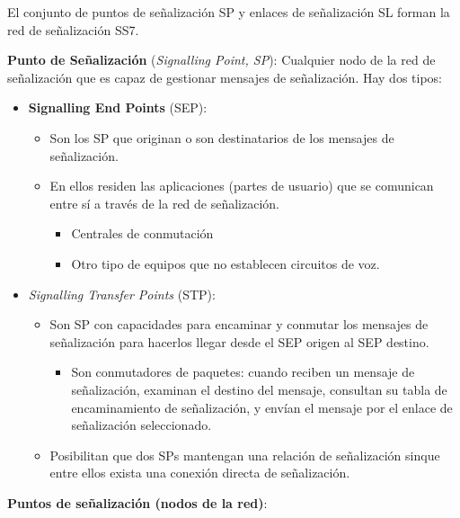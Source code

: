 \documentclass[10pt,portrait, twocolumn]{article}
\begin{document}
El conjunto de puntos de señalización SP y enlaces de señalización SL forman la red de señalización SS7.

\textbf{Punto de Señalización} (\textit{Signalling Point, SP}): Cualquier nodo de la red de señalización que es capaz de gestionar mensajes de señalización. Hay dos tipos:

	\begin{itemize}
	\item \textbf{Signalling End Points } (SEP):
		\begin{itemize}
		\item Son los SP que originan o son destinatarios de los mensajes de señalización.
		\item En ellos residen las aplicaciones (partes de usuario) que se comunican entre sí a través de la red de señalización.
			\begin{itemize}
			\item Centrales de conmutación 
			\item Otro tipo de equipos que no establecen circuitos de voz.
			\end{itemize}
	
		\end{itemize}
	\item \textit{Signalling Transfer Points} (STP):
		\begin{itemize}
		\item Son SP con capacidades para encaminar y conmutar los mensajes de señalización para hacerlos llegar desde el SEP origen al SEP destino.
			\begin{itemize}
			\item Son conmutadores de paquetes: cuando reciben un mensaje de señalización, examinan el destino del mensaje, consultan su tabla de encaminamiento de señalización, y envían el mensaje por el enlace de señalización seleccionado.
			\end{itemize}
			\item Posibilitan que dos SPs mantengan una relación de señalización sinque entre ellos exista una conexión directa de señalización.
		\end{itemize}
	\end{itemize}
	
\textbf{Puntos de señalización (nodos de la red)}:
\end{document}
